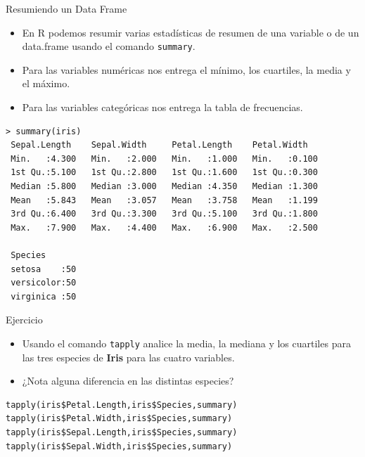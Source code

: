 \documentclass[handout]{beamer}
\begin{document}
\begin{frame}[fragile]{Resumiendo un Data Frame}
\scriptsize{
\begin{itemize}
 \item En R podemos resumir varias estadísticas de resumen de una variable o de un data.frame usando el comando \verb+summary+.
 \item Para las variables numéricas nos entrega el mínimo, los cuartiles, la media y el máximo. 
 \item Para las variables categóricas nos entrega la tabla de frecuencias.
\end{itemize}


\begin{verbatim}
> summary(iris)
 Sepal.Length    Sepal.Width     Petal.Length    Petal.Width   
 Min.   :4.300   Min.   :2.000   Min.   :1.000   Min.   :0.100  
 1st Qu.:5.100   1st Qu.:2.800   1st Qu.:1.600   1st Qu.:0.300  
 Median :5.800   Median :3.000   Median :4.350   Median :1.300  
 Mean   :5.843   Mean   :3.057   Mean   :3.758   Mean   :1.199  
 3rd Qu.:6.400   3rd Qu.:3.300   3rd Qu.:5.100   3rd Qu.:1.800  
 Max.   :7.900   Max.   :4.400   Max.   :6.900   Max.   :2.500  

 Species  
 setosa    :50  
 versicolor:50  
 virginica :50   
\end{verbatim}

 
} 
\end{frame}


\begin{frame}[fragile]{Ejercicio}
\scriptsize{
\begin{itemize}
 \item Usando el comando \verb+tapply+ analice la media, la mediana y los cuartiles para las tres especies de \textbf{Iris} para las cuatro variables.
 \item ¿Nota alguna diferencia en las distintas especies?
\end{itemize}

\pause

\begin{verbatim}
tapply(iris$Petal.Length,iris$Species,summary)
tapply(iris$Petal.Width,iris$Species,summary)
tapply(iris$Sepal.Length,iris$Species,summary)
tapply(iris$Sepal.Width,iris$Species,summary) 
\end{verbatim}

 
} 
\end{frame}
\end{document}
